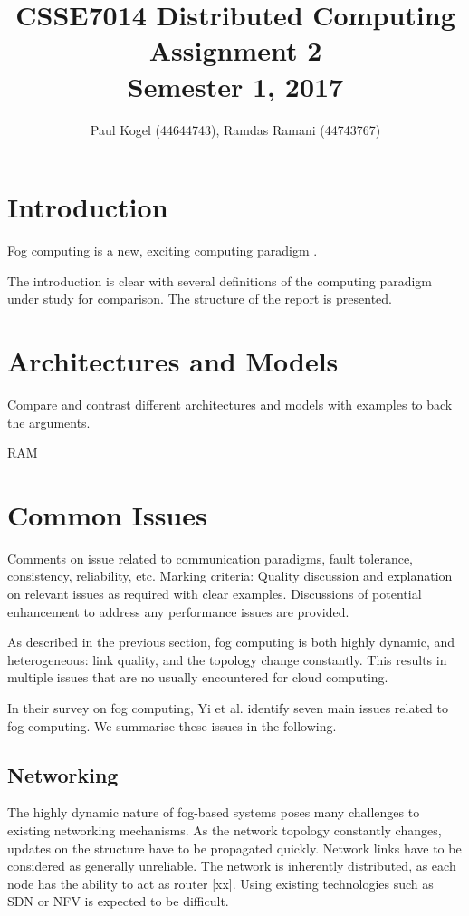 \documentclass{article}
\title{CSSE7014 Distributed Computing \\
Assignment 2 \\
Semester 1, 2017}
\author{Paul Kogel (44644743), Ramdas Ramani (44743767)}
\begin{document}
\maketitle

\pagebreak
\tableofcontents\thispagestyle{plain}

\pagebreak

\section{Introduction}

Fog computing is a new, exciting computing paradigm \cite{bonomi2012fog}.

The introduction is clear with several definitions of the computing paradigm under study for comparison. The structure of the report is presented.

\section{Architectures and Models}
Compare and contrast different architectures and models with examples to back the arguments.

RAM


\section{Common Issues}
Comments on issue related to communication paradigms, fault tolerance, consistency, reliability, etc.
Marking criteria: Quality discussion and explanation on relevant issues as required with clear examples. Discussions of potential enhancement to address any performance issues are provided.

As described in the previous section, fog computing is both highly dynamic, and heterogeneous: link quality, and the topology change constantly. This results in multiple issues that are no usually encountered for cloud computing.

In their survey on fog computing, Yi et al. identify seven main issues related to fog computing. We summarise these issues in the following.

\subsection{Networking}
The highly dynamic nature of fog-based systems poses many challenges to existing networking mechanisms. As the network topology constantly changes, updates on the structure have to be propagated quickly. Network links have to be considered as generally unreliable. The network is inherently distributed, as each node has the ability to act as router [xx]. Using existing technologies such as SDN or NFV is expected to be difficult. 
\end{document}
